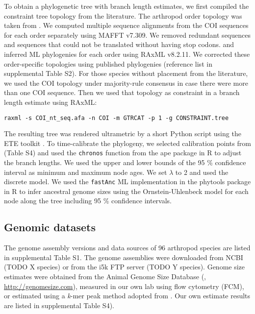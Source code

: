 To obtain a phylogenetic tree with branch length estimates, we first
compiled the constraint tree topology from the literature. The arthropod
order topology was taken from \citep{Misof2014}. We computed multiple
sequence alignments from the COI sequences for each order separately
using MAFFT v7.309. We removed redundant sequences and sequences that
could not be translated without having stop codons. and inferred ML
phylogenies for each order using RAxML v8.2.11. We corrected these
order-specific topologies using published phylogenies (reference list in
supplemental Table S2). For those species without placement from the
literature, we used the COI topology under majority-rule consensus in
case there were more than one COI sequence. Then we used that topology
as constraint in a branch length estimate using RAxML:

\begin{verbatim}
raxml -s COI_nt_seq.afa -n COI -m GTRCAT -p 1 -g CONSTRAINT.tree
\end{verbatim}

The resulting tree was rendered ultrametric by a short Python script
using the ETE toolkit \citep{Huerta-Cepas2016}. To time-calibrate the
phylogeny, we selected calibration points from \citep{Misof2014} (Table
S4) and used the \texttt{chronos} function from the ape package in R to
adjust the branch lengths. We used the upper and lower bounds of the 95
\% confidence interval as minimum and maximum node ages. We set
$\lambda$ to 2 and used the discrete model. We used the
\texttt{fastAnc} ML implementation in the phytools package
\citep{Revell2012} in R to infer ancestral genome sizes using the
Ornstein-Uhlenbeck model for each node along the tree including 95 \%
confidence intervals.

\subsection{Genomic datasets}

The genome assembly versions and data sources of 96 arthropod species
are listed in supplemental Table S1. The genome assemblies were
downloaded from NCBI (TODO X species) or from the i5k FTP server (TODO Y
species). Genome size estimates were obtained from the Animal Genome
Size Database (\citep{Gregory2018}, \url{http://genomesize.com}),
measured in our own lab using flow cytometry (FCM), or estimated using a
\emph{k}-mer peak method adopted from \citet{Hozza2015}. Our own
estimate results are listed in supplemental Table S4).

